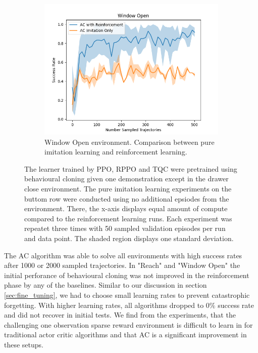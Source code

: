 \begin{figure}[htbp]
\begin{subfigure}[t]{0.45\textwidth}
      \includegraphics[width=\textwidth]{images/1_2000_imi/Window Open.png}
      \caption{Window Open environment. Comparison between pure imitation learning and reinforcement learning.}
    \end{subfigure}
    \caption{
    The learner trained by PPO, RPPO and TQC were pretrained using behavioural cloning given one demonstration except in the drawer close environment. 
    The pure imitation learning experiments on the buttom row were conducted using no additional epsiodes from the environment. There, the x-axis 
    displays equal amount of compute compared to the reinforcement learning runs.
    Each experiment was repeatet three times with 
    50 sampled validation episodes per run and data point. The shaded region displays one standard deviation.}
    \label{fig:guided_ref}
\end{figure}

The AC algorithm was able to solve all environments with high success rates after 1000 or 2000 sampled trajectories. In "Reach" and "Window Open" the initial perforance 
of behavioural cloning was not improved in the reinforcement phase by any of the baselines. Similar to our discussion in section \ref{sec:fine_tuning}, 
we had to choose small learning rates to prevent catastrophic forgetting. With higher learning rates, all algorithms dropped to $0 \%$ success rate and did 
not recover in initial tests. We find from the experiments, that the challenging one observation sparse reward environment is difficult to learn in for 
traditional actor critic algorithms and that AC is a significant improvement in these setups.\\

